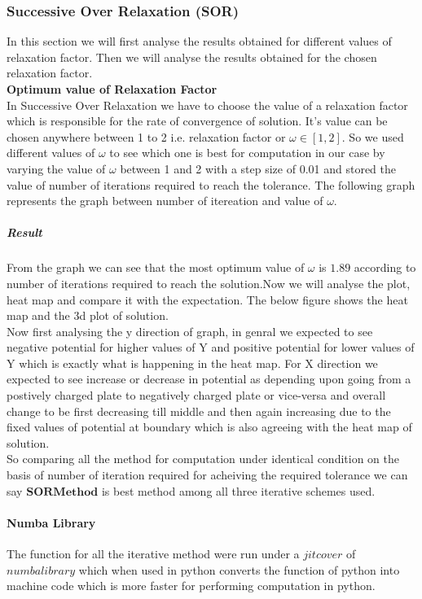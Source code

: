 \subsubsection{Successive Over Relaxation (SOR)}
In this section we will first analyse the results obtained for different values of relaxation factor. Then we will analyse the results obtained for the chosen relaxation factor. 
\\[2mm]
\noindent
\textbf{ Optimum value of Relaxation Factor } \\
In Successive Over Relaxation we have to choose the value of a relaxation factor which is responsible for the rate of convergence of solution. It's value can be chosen anywhere between 1 to 2 i.e. relaxation factor or $\omega  \in [1,2]$. So we used different values of $ \omega $ to see which one is best for computation in our case by varying the value of $\omega$ between 1 and 2 with a step size of 0.01 and stored the value of number of iterations  required to reach the tolerance. The following graph represents the graph between number of itereation and value of $\omega$. \\

\subparagraph{Result}
From the graph we can see that the most optimum value of $ \omega $ is $1.89$ according to number of iterations required to reach the solution.Now we will analyse the plot, heat map and  compare it with the expectation. The below figure shows the heat map and the 3d plot of solution. \\
Now first analysing the y direction of graph, in genral we expected to see  negative potential for higher values of Y and positive potential for lower values of Y which is exactly what is happening in the heat map. For X direction we expected to see increase or decrease in potential as depending upon going from a postively charged plate to negatively charged plate or vice-versa and overall change to be first decreasing till middle and then again increasing due to the fixed values of potential at boundary which is also agreeing with the heat map of solution.\\

So comparing all the method for computation under identical condition on the basis of number of iteration required for acheiving the required tolerance we can say $ \boldsymbol{SOR Method} $ is best method among all three iterative schemes used.

\paragraph{Numba Library} The function for all the iterative method were run under a $ jit cover $ of $ numba library$ which when used in python converts the function of python into machine code which is more faster for performing computation in python.


